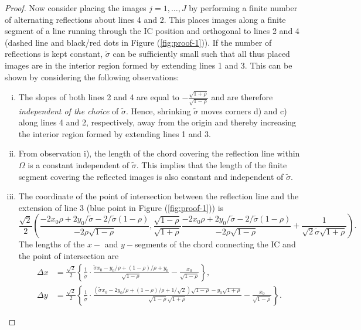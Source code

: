 \documentclass[10pt]{article}
\begin{document}
\begin{proof}
  Now consider placing the images $j = 1, \ldots, J$ by performing a
  finite number of alternating reflections about lines 4 and 2. This
  places images along a finite segment of a line running through the
  IC position and orthogonal to lines 2 and 4 (dashed line and
  black/red dots in Figure (\ref{fig:proof-1})). If the number of
  reflections is kept constant, $\tilde{\sigma}$ can be sufficiently
  small such that all thus placed images are in the interior region
  formed by extending lines 1 and 3. This can be shown by considering
  the following observations:
  \begin{enumerate}[i)]
  \item The slopes of both lines 2 and 4 are equal to
    $-\frac{\sqrt{1+\rho}}{\sqrt{1-\rho}}$ and are therefore
    \textit{independent of the choice} of $\tilde{\sigma}$. Hence,
    shrinking $\tilde{\sigma}$ moves corners d) and c) along lines 4
    and 2, respectively, away from the origin and thereby increasing
    the interior region formed by extending lines 1 and 3.
  \item From observation i), the length of the chord covering the
    reflection line within $\Omega$ is a constant independent of
    $\tilde{\sigma}$.  This implies that the length of the finite
    segment covering the reflected images is also constant and
    independent of $\tilde{\sigma}$.
  \item The coordinate of the point of intersection between the
    reflection line and the extension of line 3 (blue point in Figure
    (\ref{fig:proof-1})) is
    \[
      \frac{\sqrt{2}}{2} \left( \frac{-2 x_0\rho + 2
          y_0/\tilde{\sigma} -
          2/\tilde{\sigma}(1-\rho)}{-2\rho\sqrt{1-\rho}},
        \frac{\sqrt{1-\rho}}{\sqrt{1+\rho}}\frac{-2 x_0\rho + 2
          y_0/\tilde{\sigma} -
          2/\tilde{\sigma}(1-\rho)}{-2\rho\sqrt{1-\rho}} +
        \frac{1}{\sqrt{2}\tilde{\sigma}\sqrt{1+\rho}} \right).
    \]
    The lengths of the $x-$ and $y-$segments of the chord connecting
    the IC and the point of intersection are
    \begin{align*}
      \Delta x &= \frac{\sqrt{2}}{2}\left\{ \frac{1}{\tilde{\sigma}}\cdot\frac{\tilde{\sigma}x_0 - y_0/\rho + (1-\rho)/\rho + y_0}{\sqrt{1-\rho}} - \frac{x_0}{\sqrt{1-\rho}} \right\},\\
      \Delta y &= \frac{\sqrt{2}}{2} \left\{ \frac{1}{\tilde{\sigma}}\cdot\frac{(\tilde{\sigma}x_0 - 2y_0/\rho + (1-\rho)/\rho + 1/\sqrt{2})\sqrt{1-\rho} - y_0\sqrt{1+\rho}}{\sqrt{1-\rho}\sqrt{1+\rho}}- \frac{x_0}{\sqrt{1-\rho}} \right\}.

\end{align*}
\end{enumerate}
\end{proof}
\end{document}
